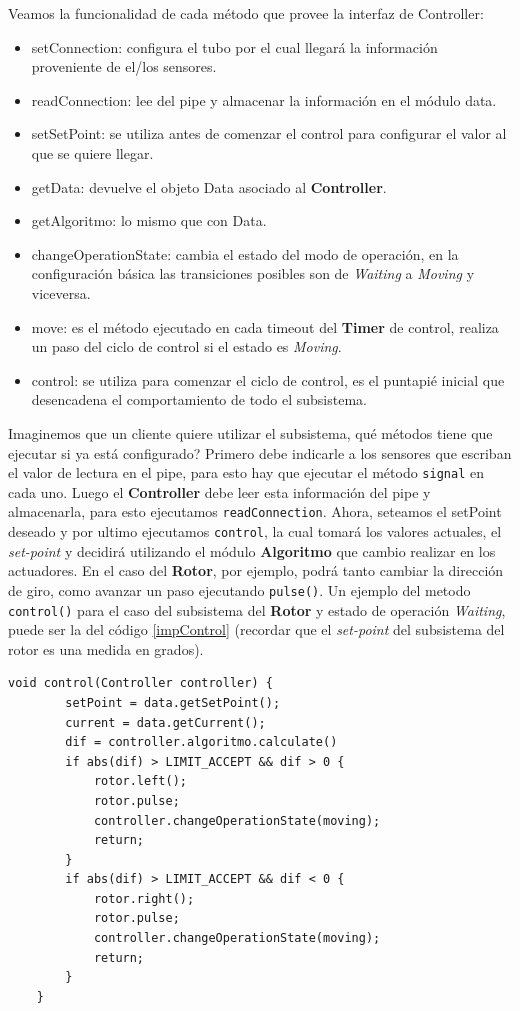 Veamos la funcionalidad de cada método que provee la interfaz de Controller:
\begin{itemize}
    \item setConnection: configura el tubo por el cual llegará la información proveniente de el/los sensores.
    \item readConnection: lee del pipe y almacenar la información en el módulo data.
    \item setSetPoint: se utiliza antes de comenzar el control para configurar el valor al que se quiere llegar.
    \item getData: devuelve el objeto Data asociado al \textbf{Controller}.
    \item getAlgoritmo: lo mismo que con Data.
    \item changeOperationState: cambia el estado del modo de operación, en la configuración básica las transiciones posibles son de \textit{Waiting} a \textit{Moving} y viceversa.
    \item move: es el método ejecutado en cada timeout del \textbf{Timer} de control, realiza un paso del ciclo de control si el estado es \textit{Moving}.
    \item control: se utiliza para comenzar el ciclo de control, es el puntapié inicial que desencadena el comportamiento de todo el subsistema.
\end{itemize}

Imaginemos que un cliente quiere utilizar el subsistema, qué métodos tiene que ejecutar si ya está configurado? Primero debe indicarle a los sensores que escriban el valor de lectura en el pipe, para esto hay que ejecutar el método \verb|signal| en cada uno. Luego el \textbf{Controller} debe leer esta información del pipe y almacenarla, para esto ejecutamos \verb|readConnection|. Ahora, seteamos el setPoint deseado y por ultimo ejecutamos \verb|control|, la cual tomará los valores actuales, el \textit{set-point} y decidirá utilizando el módulo \textbf{Algoritmo} que cambio realizar en los actuadores. En el caso del \textbf{Rotor}, por ejemplo, podrá tanto cambiar la dirección de giro, como avanzar un paso ejecutando \verb|pulse()|. Un ejemplo del metodo \verb|control()| para el caso del subsistema del \textbf{Rotor} y estado de operación \textit{Waiting}, puede ser la del código \ref{impControl} (recordar que el \textit{set-point} del subsistema del rotor es una medida en grados).

\begin{lstlisting}[caption=Ejemplo implementación control,label={impControl}]
    void control(Controller controller) {
        setPoint = data.getSetPoint();
        current = data.getCurrent();
        dif = controller.algoritmo.calculate()
        if abs(dif) > LIMIT_ACCEPT && dif > 0 {
            rotor.left();
            rotor.pulse;
            controller.changeOperationState(moving);
            return;
        }
        if abs(dif) > LIMIT_ACCEPT && dif < 0 {
            rotor.right();
            rotor.pulse;
            controller.changeOperationState(moving);
            return;
        }
    }
\end{lstlisting}

